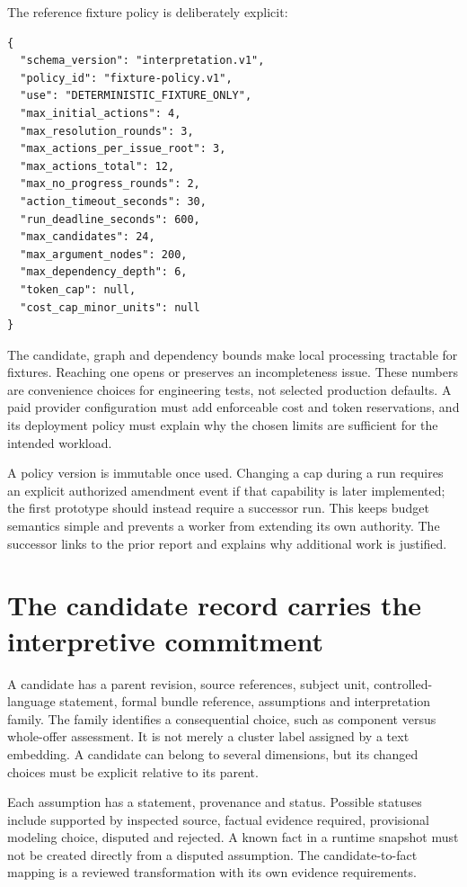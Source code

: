 \documentclass[12pt,a4paper,oneside,openany]{book}
\begin{document}
The reference fixture policy is deliberately explicit:
\begin{lstlisting}[caption={Reference limits for deterministic controller fixtures.}]
{
  "schema_version": "interpretation.v1",
  "policy_id": "fixture-policy.v1",
  "use": "DETERMINISTIC_FIXTURE_ONLY",
  "max_initial_actions": 4,
  "max_resolution_rounds": 3,
  "max_actions_per_issue_root": 3,
  "max_actions_total": 12,
  "max_no_progress_rounds": 2,
  "action_timeout_seconds": 30,
  "run_deadline_seconds": 600,
  "max_candidates": 24,
  "max_argument_nodes": 200,
  "max_dependency_depth": 6,
  "token_cap": null,
  "cost_cap_minor_units": null
}
\end{lstlisting}

The candidate, graph and dependency bounds make local processing tractable for
fixtures. Reaching one opens or preserves an incompleteness issue. These numbers
are convenience choices for engineering tests, not selected production defaults.
A paid provider configuration must add enforceable cost and token reservations,
and its deployment policy must explain why the chosen limits are sufficient for
the intended workload.

A policy version is immutable once used. Changing a cap during a run requires an
explicit authorized amendment event if that capability is later implemented;
the first prototype should instead require a successor run. This keeps budget
semantics simple and prevents a worker from extending its own authority. The
successor links to the prior report and explains why additional work is justified.

\section{The candidate record carries the interpretive commitment}
\label{merge:M08:03}


A candidate has a parent revision, source references, subject unit, controlled-
language statement, formal bundle reference, assumptions and interpretation
family. The family identifies a consequential choice, such as component versus
whole-offer assessment. It is not merely a cluster label assigned by a text
embedding. A candidate can belong to several dimensions, but its changed choices
must be explicit relative to its parent.

Each assumption has a statement, provenance and status. Possible statuses include
supported by inspected source, factual evidence required, provisional modeling
choice, disputed and rejected. A known fact in a runtime snapshot must not be
created directly from a disputed assumption. The candidate-to-fact mapping is a
reviewed transformation with its own evidence requirements.
\end{document}

